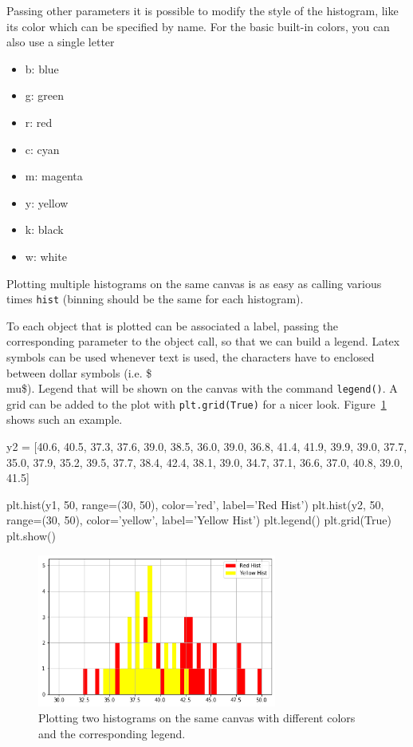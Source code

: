 \begin{ipython}
Passing other parameters it is possible to modify the style of the
histogram, like its color which can be specified by name. For
the basic built-in colors, you can also use a single letter

\begin{itemize}
	\tightlist
	\item
	b: blue
	\item
	g: green
	\item
	r: red
	\item
	c: cyan
	\item
	m: magenta
	\item
	y: yellow
	\item
	k: black
	\item
	w: white
\end{itemize}

Plotting multiple histograms on the same canvas is as easy as calling
various times \texttt{hist} (binning should be the same for each
histogram).

To each object that is plotted can be associated a label, passing the
corresponding parameter to the object call, so that we can build a
legend. Latex symbols can be used whenever text is used, the characters
have to enclosed between dollar symbols (i.e. \$\\mu\$). Legend that
will be shown on the canvas with the command \texttt{legend()}.
A grid can be added to the plot with \texttt{plt.grid(True)} for a nicer
look. Figure~\ref{fig:histo3} shows such an example.

\begin{ipython}
y2 = [40.6, 40.5, 37.3, 37.6, 39.0, 38.5, 36.0, 
      39.0, 36.8, 41.4, 41.9, 39.9, 39.0, 37.7, 
      35.0, 37.9, 35.2, 39.5, 37.7, 38.4, 42.4, 
      38.1, 39.0, 34.7, 37.1, 36.6, 37.0, 40.8, 
      39.0, 41.5]

plt.hist(y1, 50, range=(30, 50), color='red', label='Red Hist')
plt.hist(y2, 50, range=(30, 50), color='yellow', label='Yellow Hist')
plt.legend()
plt.grid(True)
plt.show()
\end{ipython}

\begin{figure}[htb]
	\centering
	\includegraphics[width=0.7\textwidth]{figures/histo3}
	\caption{Plotting two histograms on the same canvas with different colors and the 
		corresponding legend.}
	\label{fig:histo3}
\end{figure}


\end{ipython}
